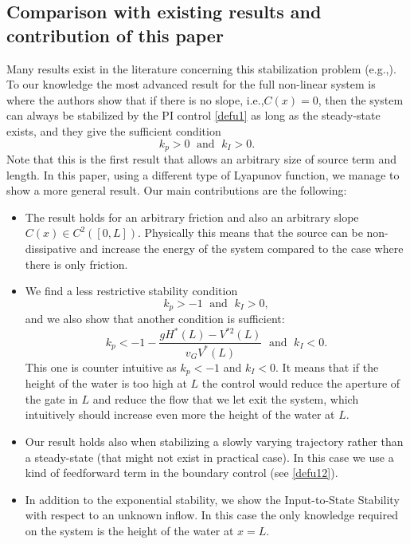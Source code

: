 \documentclass[11pt]{article}
\newcommand{\ie}{i.e.,\xspace}
\newcommand{\eg}{e.g.,\xspace}
\numberwithin{equation}{section}
\theoremstyle{definition}
\begin{document}
\subsection{Comparison with existing results and contribution of this paper}
Many results exist in the literature concerning this stabilization problem (\eg \cite{dos2008, XuSallet, BastinCoron2013, XuSallet2014, Trinh2015, BastinCoronTamasoiu2015, BastinCoronPI}). To our knowledge the most advanced result for the full non-linear system is \cite{BastinCoronPI} where the authors show that if there is no slope, \ie $C(x) = 0$, then the system can always be stabilized by the PI control \eqref{defu1} as long as the steady-state exists, and they give the sufficient condition
\begin{equation*}%
k_{p}>0\;\text{ and }\;k_{I}>0.
\end{equation*}
Note that this is the first result that allows an arbitrary size of source term and length.
In this paper, using a different type of Lyapunov function, we manage to show a more general result. Our main contributions are the following:
\begin{itemize}
\item The result holds for an arbitrary friction and also an arbitrary slope $C(x)\in C^{2}([0,L])$. Physically this means that the source can be non-dissipative and increase the energy of the system compared to the case where there is only friction.
\item We find a less restrictive stability condition
\begin{equation*}
k_{p}>-1\;\text{ and }\;k_{I}>0,
\end{equation*}
and we also show that another condition is sufficient:
\begin{equation*}
k_{p}<-1-\frac{gH^{*}(L)-V^{*2}(L)}{v_{G}V^{*}(L)}\;\text{ and }\; k_{I}<0.
\end{equation*}
This one is counter intuitive as $k_{p}<-1$ and $k_{I}<0$. {{It} means that if the height of the water is too high at $L$ the control would reduce the aperture of the gate in $L$ and reduce the flow that we let exit the system,
which intuitively should increase even more the height of the water at $L$.}
\item Our result holds also when stabilizing a slowly varying trajectory rather than a steady-state (that might not exist in practical case). In this case we use a kind of feedforward term in the boundary control {(see \eqref{defu12})}.
\item In addition to the exponential stability, we show the Input-to-State Stability with respect to an unknown inflow. In this case the only knowledge required on the system is the height of the water at $x=L$.
\end{itemize}
\end{document}
